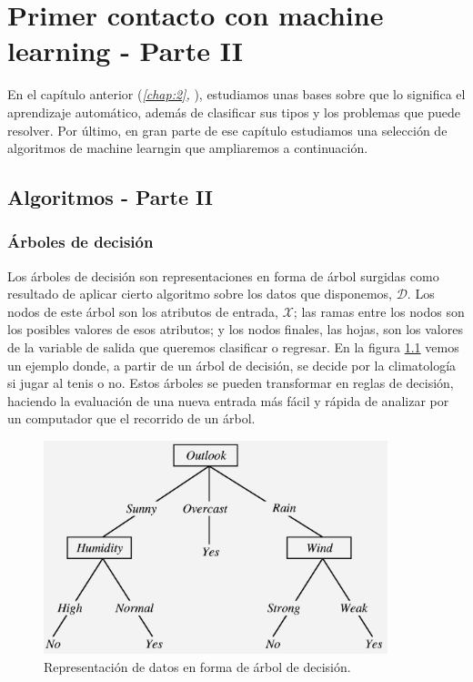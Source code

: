 \chapter{Primer contacto con machine learning - Parte II} \label{chap:3}

\vspace*{5mm}

En el capítulo anterior (\emph{\ref{chap:2}, }), estudiamos unas bases sobre que lo significa el aprendizaje automático, además de clasificar sus tipos y los problemas que puede resolver. Por último, en gran parte de ese capítulo estudiamos una selección de algoritmos de machine learngin que ampliaremos a continuación.

\section{Algoritmos - Parte II} \label{sec:3.1}

\subsection{Árboles de decisión} \label{subsec:3.1.1}

Los árboles de decisión son representaciones en forma de árbol surgidas como resultado de aplicar cierto algoritmo sobre los datos que disponemos, $\mathcal{D}$. Los nodos de este árbol son los atributos de entrada, $\mathcal{X}$; las ramas entre los nodos son los posibles valores de esos atributos; y los nodos finales, las hojas, son los valores de la variable de salida que queremos clasificar o regresar. En la figura \ref{fig:3.1} vemos un ejemplo donde, a partir de un árbol de decisión, se decide por la climatología si jugar al tenis o no. Estos árboles se pueden transformar en reglas de decisión, haciendo la evaluación de una nueva entrada más fácil y rápida de analizar por un computador que el recorrido de un árbol.

\begin{figure}[ht]
  \centering
  \includegraphics[width=100mm]{figures/ch_03/decision_tree_example.png}
  \caption{Representación de datos en forma de árbol de decisión. \cite{vidal2009decision}}
  \label{fig:3.1}
\end{figure}

